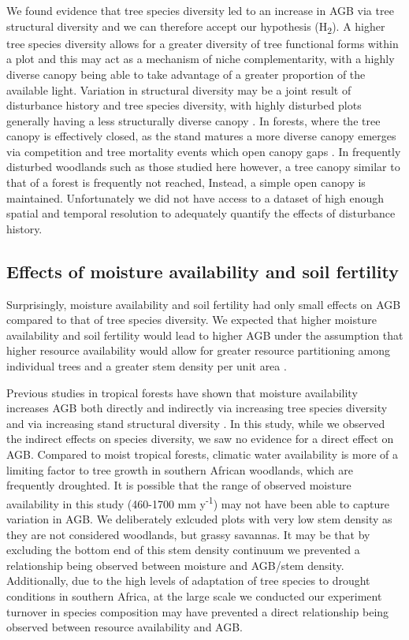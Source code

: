 \documentclass[11pt,a4paper]{article}
\begin{document}
We found evidence that tree species diversity led to an increase in AGB via tree structural diversity and we can therefore accept our hypothesis (H\textsubscript{2}). A higher tree species diversity allows for a greater diversity of tree functional forms within a plot and this may act as a mechanism of niche complementarity, with a highly diverse canopy being able to take advantage of a greater proportion of the available light. Variation in structural diversity may be a joint result of disturbance history and tree species diversity, with highly disturbed plots generally having a less structurally diverse canopy \citep{LaRue2019}. In forests, where the tree canopy is effectively closed, as the stand matures a more diverse canopy emerges via competition and tree mortality events which open canopy gaps \citep{Muscolo2014}. In frequently disturbed woodlands such as those studied here however, a tree canopy similar to that of a forest is frequently not reached, Instead, a simple open canopy is maintained. Unfortunately we did not have access to a dataset of high enough spatial and temporal resolution to adequately quantify the effects of disturbance history. 

\subsection{Effects of moisture availability and soil fertility}

Surprisingly, moisture availability and soil fertility had only small effects on AGB compared to that of tree species diversity. We expected that higher moisture availability and soil fertility would lead to higher AGB under the assumption that higher resource availability would allow for greater resource partitioning among individual trees \citep{} and a greater stem density per unit area \citep{}.

Previous studies in tropical forests have shown that moisture availability increases AGB both directly and indirectly via increasing tree species diversity and via increasing stand structural diversity \citep{Ali2019a, Ali2019b, Poorter2017}. In this study, while we observed the indirect effects on species diversity, we saw no evidence for a direct effect on AGB. Compared to moist tropical forests, climatic water availability is more of a limiting factor to tree growth in southern African woodlands, which are frequently droughted. It is possible that the range of observed moisture availability in this study (\textapprox{}460-1700 mm y\textsuperscript{-1}) may not have been able to capture variation in AGB. We deliberately exlcuded plots with very low stem density as they are not considered woodlands, but grassy savannas. It may be that by excluding the bottom end of this stem density continuum we prevented a relationship being observed between moisture and AGB/stem density. Additionally, due to the high levels of adaptation of tree species to drought conditions in southern Africa, at the large scale we conducted our experiment turnover in species composition may have prevented a direct relationship being observed between resource availability and AGB.
\end{document}

